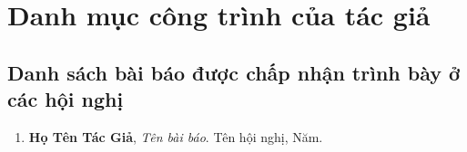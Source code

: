 \chapter*{Danh mục công trình của tác giả}\label{PublishedPapers}
\section*{Danh sách bài báo được chấp nhận trình bày ở các hội nghị}
\begin{enumerate}
\item[CT-01] \hypertarget{pub:CT-01}{} \textbf{Họ Tên Tác Giả}, \textit{Tên bài báo}. Tên hội nghị, Năm.
\end{enumerate}
